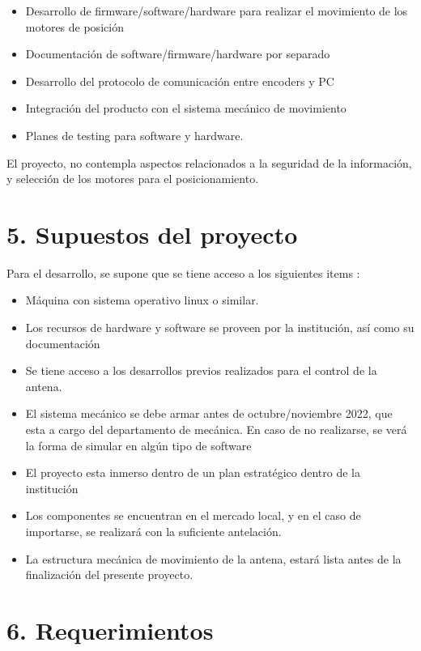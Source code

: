 \documentclass[11pt, %
codirector, %
]{charter}
\begin{document}
\begin{itemize}
	\item Desarrollo de firmware/software/hardware para realizar el movimiento de los motores de posición 
	\item  Documentación de software/firmware/hardware por separado
	\item  Desarrollo del protocolo de comunicación entre encoders y PC
	\item  Integración del producto con el sistema mecánico de movimiento
	\item Planes de testing para software y hardware. 
	
\end{itemize}

El proyecto, no contempla aspectos relacionados a la seguridad de la información, y selección de los motores para el posicionamiento.  


\section{5. Supuestos del proyecto}
\label{sec:supuestos}
	Para el desarrollo, se supone que se tiene acceso a los siguientes items : 
	\begin{itemize}
		\item Máquina con sistema operativo linux o similar. 
		\item Los recursos de hardware y software se proveen por la institución, así como su documentación
		\item Se tiene acceso a los desarrollos previos realizados para el control de la antena. 
		\item El sistema mecánico se debe armar antes de octubre/noviembre 2022, que esta a cargo del departamento de mecánica. En caso de no realizarse, se verá la forma de simular en algún tipo de software
		\item El proyecto esta inmerso dentro de un plan estratégico dentro de la institución
		\item Los componentes se encuentran en el mercado local, y en el caso de importarse, se realizará con la suficiente antelación. 
		\item La estructura mecánica de movimiento de la antena, estará lista antes de la finalización del presente proyecto. 

	\end{itemize}

\section{6. Requerimientos}
\label{sec:requerimientos}
\end{document}
